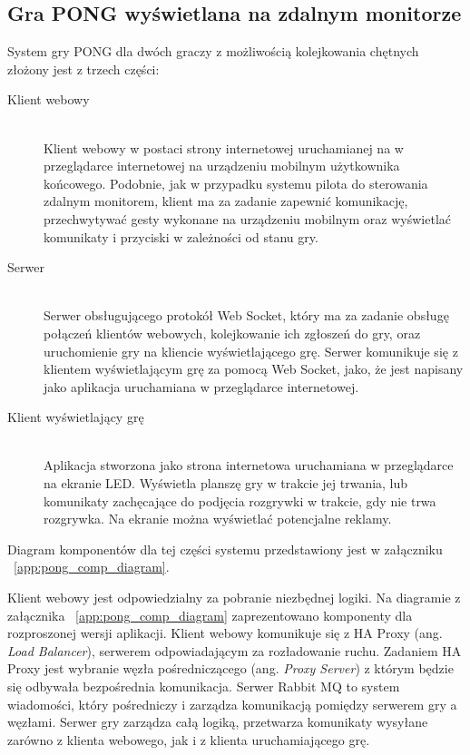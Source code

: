 \subsection{Gra PONG wyświetlana na zdalnym monitorze}

System gry PONG dla dwóch graczy z możliwością kolejkowania chętnych złożony jest z trzech części:

\begin{description}
  \item[Klient webowy] \hfill \\
  Klient webowy w postaci strony internetowej uruchamianej na w przeglądarce internetowej na urządzeniu mobilnym użytkownika końcowego. Podobnie, jak w przypadku systemu pilota do sterowania zdalnym monitorem, klient ma za zadanie zapewnić komunikację, przechwytywać gesty wykonane na urządzeniu mobilnym oraz wyświetlać komunikaty i przyciski w zależności od stanu gry.
  \item[Serwer] \hfill \\
  Serwer obsługującego protokół Web Socket, który ma za zadanie obsługę połączeń klientów webowych, kolejkowanie ich zgłoszeń do gry, oraz uruchomienie gry na kliencie wyświetlającego grę. Serwer komunikuje się z klientem wyświetlającym grę za pomocą Web Socket, jako, że jest napisany jako aplikacja uruchamiana w przeglądarce internetowej.
  \item[Klient wyświetlający grę] \hfill \\
  Aplikacja stworzona jako strona internetowa uruchamiana w przeglądarce na ekranie LED. Wyświetla planszę gry w trakcie jej trwania, lub komunikaty zachęcające do podjęcia rozgrywki w trakcie, gdy nie trwa rozgrywka. Na ekranie można wyświetlać potencjalne reklamy.
\end{description}


Diagram komponentów dla tej części systemu przedstawiony jest w załączniku ~\ref{app:pong_comp_diagram}.

\par

Klient webowy jest odpowiedzialny za pobranie niezbędnej logiki. Na diagramie z załącznika ~\ref{app:pong_comp_diagram} zaprezentowano komponenty dla rozproszonej wersji aplikacji. Klient webowy komunikuje się z HA Proxy (ang. \emph{Load Balancer}), serwerem odpowiadającym za rozładowanie ruchu. Zadaniem HA Proxy jest wybranie węzła pośredniczącego (ang. \emph{Proxy Server}) z którym będzie się odbywała bezpośrednia komunikacja. Serwer Rabbit MQ to system wiadomości, który pośredniczy i zarządza komunikacją pomiędzy serwerem gry a węzłami. Serwer gry zarządza całą logiką, przetwarza komunikaty wysyłane zarówno z klienta webowego, jak i z klienta uruchamiającego grę. 

